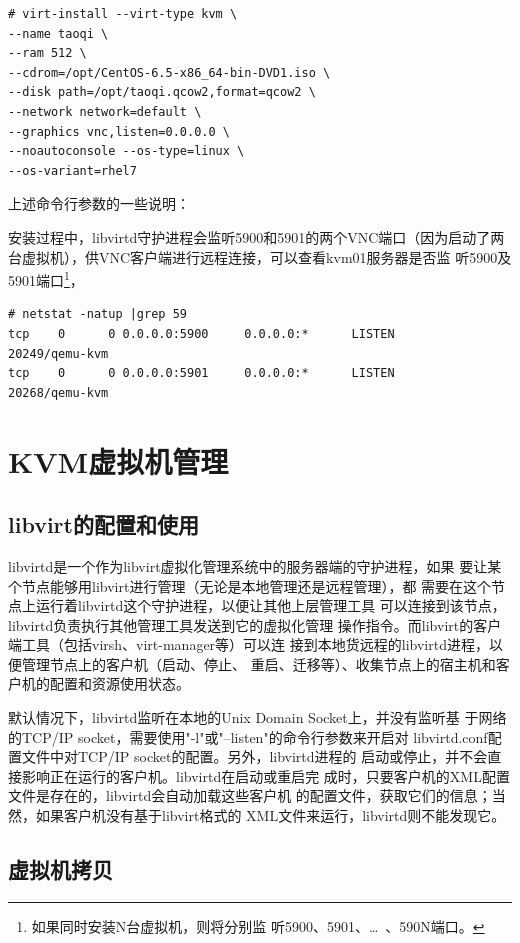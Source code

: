 \begin{verbatim}
# virt-install --virt-type kvm \
--name taoqi \
--ram 512 \
--cdrom=/opt/CentOS-6.5-x86_64-bin-DVD1.iso \
--disk path=/opt/taoqi.qcow2,format=qcow2 \
--network network=default \
--graphics vnc,listen=0.0.0.0 \
--noautoconsole --os-type=linux \
--os-variant=rhel7
\end{verbatim}

上述命令行参数的一些说明：

安装过程中，libvirtd守护进程会监听5900和5901的两个VNC端口（因为启动了两
台虚拟机），供VNC客户端进行远程连接，可以查看kvm01服务器是否监
听5900及5901端口\footnote{如果同时安装N台虚拟机，则将分别监
  听5900、5901、\dots\ 、590N端口。}，

\begin{verbatim}
# netstat -natup |grep 59
tcp    0      0 0.0.0.0:5900     0.0.0.0:*      LISTEN      20249/qemu-kvm      
tcp    0      0 0.0.0.0:5901     0.0.0.0:*      LISTEN      20268/qemu-kvm
\end{verbatim}

\section{KVM虚拟机管理}
\label{sec:manageKVM}

\subsection{libvirt的配置和使用}
\label{sec:configLibvirt}

libvirtd是一个作为libvirt虚拟化管理系统中的服务器端的守护进程，如果
要让某个节点能够用libvirt进行管理（无论是本地管理还是远程管理），都
需要在这个节点上运行着libvirtd这个守护进程，以便让其他上层管理工具
可以连接到该节点，libvirtd负责执行其他管理工具发送到它的虚拟化管理
操作指令。而libvirt的客户端工具（包括virsh、virt-manager等）可以连
接到本地货远程的libvirtd进程，以便管理节点上的客户机（启动、停止、
重启、迁移等）、收集节点上的宿主机和客户机的配置和资源使用状态。

默认情况下，libvirtd监听在本地的Unix Domain Socket上，并没有监听基
于网络的TCP/IP socket，需要使用"-l"或"--listen"的命令行参数来开启对
libvirtd.conf配置文件中对TCP/IP socket的配置。另外，libvirtd进程的
启动或停止，并不会直接影响正在运行的客户机。libvirtd在启动或重启完
成时，只要客户机的XML配置文件是存在的，libvirtd会自动加载这些客户机
的配置文件，获取它们的信息；当然，如果客户机没有基于libvirt格式的
XML文件来运行，libvirtd则不能发现它。

\subsection{虚拟机拷贝}
\label{sec:copyVM}

